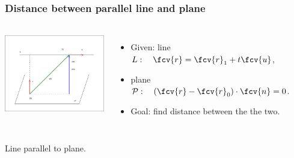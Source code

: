 \begin{frame}
\frametitle{Distance between parallel line and plane}
\begin{columns}
        \includegraphics[height=1.4in]{../../modules/vectors/pictures/ok-parallel_line_plane.eps}
    
\begin{itemize}
\item Given: line $L: \quad \fcv{r}= \fcv{r}_1+t\fcv{u}$,
\item plane $\mathcal{P}: \quad (\fcv{r}-\fcv{r}_0) \cdot \fcv{n} = 0$.
\item Goal: find distance between the the two.
\end{itemize}

\end{columns}
Line \alert<1->{parallel} to plane. 
\end{frame}
